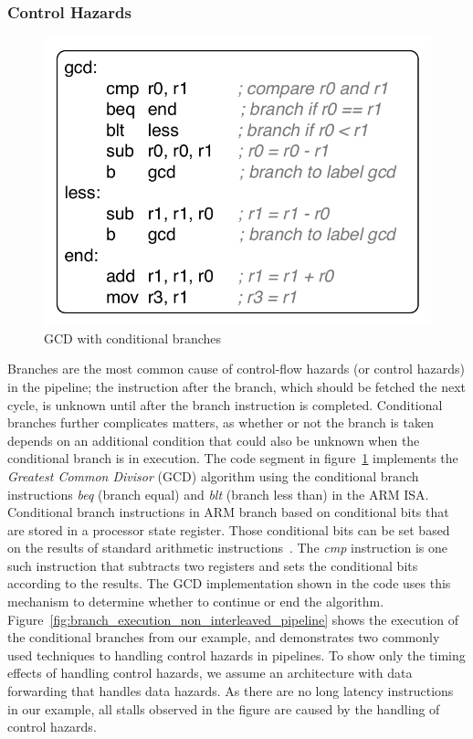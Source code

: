 \subsubsection{Control Hazards}
\begin{figure}
  \vspace{-20pt}
  \begin{center}
    \includegraphics[scale=.65]{figs/sample_gcd_code}
  \end{center}
  \vspace{-3mm}
  \caption{GCD with conditional branches}
  \label{fig:sample_gcd_code}
\end{figure}

Branches are the most common cause of control-flow hazards (or control hazards) in the pipeline; the instruction after the branch, which should be fetched the next cycle, is unknown until after the branch instruction is completed.
Conditional branches further complicates matters, as whether or not the branch is taken depends on an additional condition that could also be unknown when the conditional branch is in execution. 
The code segment in figure~\ref{fig:sample_gcd_code} implements the \emph{Greatest Common Divisor} (GCD) algorithm using the conditional branch instructions \emph{beq} (branch equal) and \emph{blt} (branch less than) in the ARM ISA.  
Conditional branch instructions in ARM branch based on conditional bits that are stored in a processor state register.
Those conditional bits can be set based on the results of standard arithmetic instructions~\cite{armrefman}.
The \emph{cmp} instruction is one such instruction that subtracts two registers and sets the conditional bits according to the results.
The GCD implementation shown in the code uses this mechanism to determine whether to continue or end the algorithm.
Figure~\ref{fig:branch_execution_non_interleaved_pipeline} shows the execution of the conditional branches from our example, and demonstrates two commonly used techniques to handling control hazards in pipelines. 
To show only the timing effects of handling control hazards, we assume an architecture with data forwarding that handles data hazards.
As there are no long latency instructions in our example, all stalls observed in the figure are caused by the handling of control hazards.  


